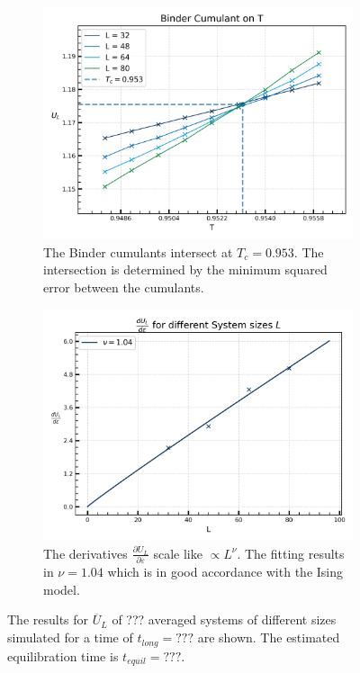 	\begin{figure}[htp]
		\begin{subfigure}{0.5\textwidth}
			\centering
			\includegraphics[width=0.8\linewidth]{graphics/cum_time_avg.png}
			\caption{The Binder cumulants intersect at $T_c =	0.953$. The intersection is determined by the minimum squared error between the cumulants.}
		\end{subfigure}
		\begin{subfigure}{0.5\textwidth}
			\centering
			\includegraphics[width=0.8\linewidth]{graphics/critical_exponent_time_avg.png}
			\caption{The derivatives $\frac{\partial U_L}{\partial \varepsilon}$ scale like $\propto L^\nu$. The fitting results in $\nu = 1.04$ which is in good accordance with the Ising model.}
		\end{subfigure}
		\caption{The results for $\overline{U}_L$ of ??? averaged systems of different sizes simulated for a time of $t_{long} =	??? $ are shown. The estimated equilibration time is $t_{equil} =	??? $.}
		\label{Fig::Binder-Cum-Result}
	\end{figure}
